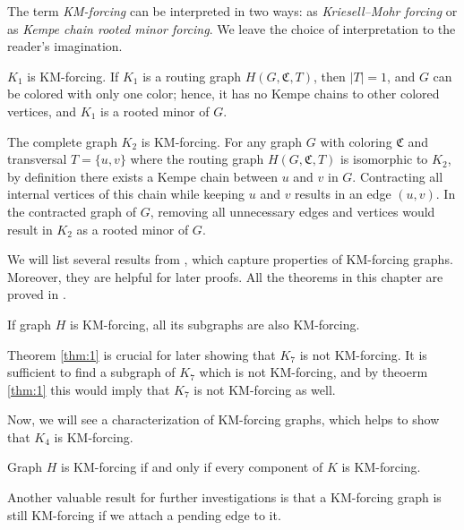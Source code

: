 \begin{rem}
    The term \emph{KM-forcing} can be interpreted in two ways: as \emph{Kriesell–Mohr forcing} or as \emph{Kempe chain rooted minor forcing}. We leave the choice of interpretation to the reader’s imagination.
\end{rem}

\begin{example}
    $K_1$ is KM-forcing. If $K_1$ is a routing graph $H(G, \mathfrak{C}, T)$, then $|T| = 1$, and $G$
can be colored with only one color; hence, it has no Kempe chains to other colored vertices, and $K_1$ is a rooted minor of $G$.
\end{example}

\begin{example}
 The complete graph $K_2$ is KM-forcing. 
 For any graph $G$ with coloring $\mathfrak{C}$ and transversal $T = \{u,v\}$ where the routing graph $H(G, \mathfrak{C}, T)$ is
 isomorphic to $K_2$, by definition there exists a Kempe chain between $u$ and $v$ in $G$. 
 Contracting all internal vertices of this chain while keeping $u$ and $v$ results in an edge $(u, v)$. In the contracted graph of $G$,
 removing all unnecessary edges and vertices would result in $K_2$ as a rooted minor of $G$.
\end{example}

We will list several results from \cite{matthias_2022}, which capture properties of KM-forcing graphs. Moreover, they are helpful 
for later proofs. All the theorems in this chapter are proved in \cite{matthias_2022}.

\begin{thm}
\label{thm:1}
 If graph $H$ is KM-forcing, all its subgraphs are also KM-forcing.
\end{thm}

Theorem \ref{thm:1} is crucial for later showing that $K_7$ is not KM-forcing. It is sufficient to find a subgraph 
of $K_7$ which is not KM-forcing, and by theoerm \ref{thm:1} this would imply that $K_7$ is not KM-forcing as well.

Now, we will see a characterization of KM-forcing graphs, which helps to show that $K_4$ is KM-forcing.

\begin{thm}
\label{thm:1.5}
 Graph $H$ is KM-forcing if and only if every component of $K$ is KM-forcing.
\end{thm}

Another valuable result for further investigations is that a KM-forcing graph is still KM-forcing if we attach a pending edge to it.

